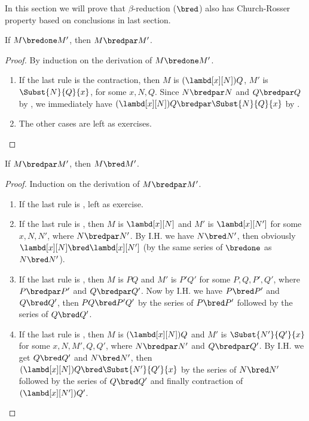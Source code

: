 \documentclass[../../../include/open-logic-section]{subfiles}
\begin{document}


In this section we will prove that $\beta$-reduction ($\bred$) also has
Church-Rosser property based on conclusions in last section.

\begin{lem}
  If $M \bredone M'$, then $M \bredpar M'$.
\end{lem}
\begin{proof} By induction on the derivation of $M \bredone M'$.
  \begin{enumerate}
  \item If the last rule is the contraction, then $M$ is
    $(\lambd[x][N])Q$, $M'$ is $\Subst{N}{Q}{x}$, for some
    $x, N, Q$. Since $N \bredpar N$ and $Q \bredpar Q$ by
    , we immediately have $(\lambd[x][N])Q
    \bredpar \Subst{N}{Q}{x}$ by .
  \item The other cases are left as exercises.
  \end{enumerate}
\end{proof}

\begin{lem}
  If $M \bredpar M'$, then $M \bred M'$.
\end{lem}
\begin{proof} Induction on the derivation of $M \bredpar M'$.
  \begin{enumerate}
  \item If the last rule is , left as exercise.
  \item If the last rule is , then $M$ is 
    $\lambd[x][N]$ and $M'$ is $\lambd[x][N']$ for some $x, N, N'$, where
    $N \bredpar N'$. By I.H. we have $N \bred N'$, then obviously
    $\lambd[x][N] \bred \lambd[x][N']$ (by the same series of
    $\bredone$ as $N \bred N'$).
  \item If the last rule is , then $M$ is 
    $PQ$ and $M'$ is $P'Q'$ for some $P, Q, P', Q'$, where $P \bredpar P'$
    and $Q \bredpar Q'$. Now by I.H. we have $P \bred P'$ and $Q \bred
    Q'$, then $PQ \bred P'Q'$ by the series of $P \bred P'$ followed
    by the series of $Q \bred Q'$.
  \item If the last rule is , then $M$ is
    $(\lambd[x][N])Q$ and $M'$ is  $\Subst{N'}{Q'}{x}$ for some
    $x, N, M', Q, Q'$, where $N \bredpar N'$ and $Q \bredpar Q'$. By I.H. we get $Q \bred
    Q'$ and $N \bred N'$, then $(\lambd[x][N])Q \bred
    \Subst{N'}{Q'}{x}$ by the series of $N \bred N'$ followed by the
    series of $Q \bred Q'$ and finally contraction of
    $(\lambd[x][N'])Q'$.
  \end{enumerate}
\end{proof}
\end{document}
